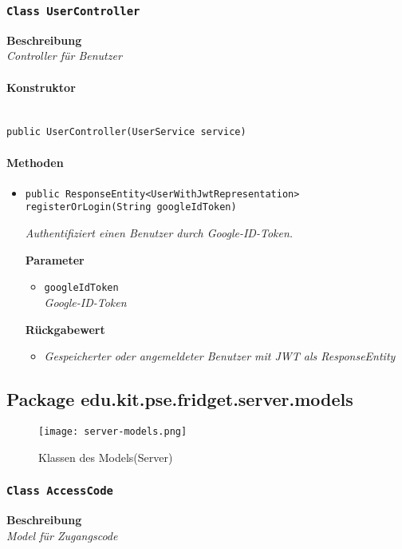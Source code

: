      \subsubsection{\texttt{Class UserController}}
     \textbf{Beschreibung} \\
     \textit{Controller für Benutzer}
     \paragraph*{Konstruktor}\mbox{} \\
     \texttt{public UserController(UserService service)}
     \paragraph*{Methoden}
     \begin{itemize}
     	\item{\texttt{public ResponseEntity<UserWithJwtRepresentation> registerOrLogin(String googleIdToken)}}
     	
     	\textit{Authentifiziert einen Benutzer durch Google-ID-Token.}
     	
     	\textbf{Parameter}
     	\begin{itemize}
     		\item\texttt{googleIdToken}\\
     		\textit{Google-ID-Token}  
     	\end{itemize}
     
     	\textbf{Rückgabewert}
     	\begin{itemize}
     		\item\textit{Gespeicherter oder angemeldeter Benutzer mit JWT als ResponseEntity}
     	\end{itemize}
     \end{itemize}
 \newpage
     \subsection{Package edu.kit.pse.fridget.server.models}
     \begin{figure}[H]
	       \centering
	       \texttt{[image: server-models.png]}
	       \caption{Klassen des Models(Server)}
	      \end{figure}
     \subsubsection{\texttt{Class AccessCode}}
     \textbf{Beschreibung} \\
     \textit{Model für Zugangscode}
